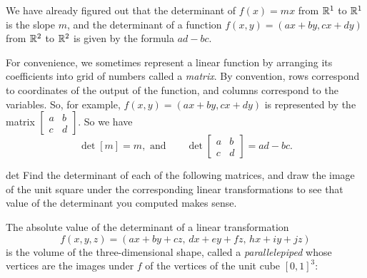 \documentclass[svgnames]{watsonbook}
\begin{document}
We have already figured out that the determinant of $f(x) = mx$ from
$\mathbb{R}^1$ to $\mathbb{R}^1$ is the slope $m$, and the determinant of a function
$f(x,y) = (ax + by, cx + dy)$ from $\mathbb{R}^2$ to $\mathbb{R}^2$ is given by the
formula $ad - bc$.

For convenience, we sometimes represent a linear function by arranging
its coefficients into grid of numbers called a \textit{matrix}. By
convention, rows correspond to coordinates of the output of the
function, and columns correspond to the variables. So, for example,
$f(x,y) = (ax + by, cx + dy)$ is represented by the matrix
$\left[\begin{array}{cc} a & b \\ c & d \end{array}\right]$. So we
have
\[
\det [m] = m, \text{ and} \qquad \det \left[\begin{array}{cc} a & b \\ c & d \end{array}\right] = ad - bc. 
\]

\begin{exercise}{}{det}
  Find the determinant of each of the following matrices, and draw the image of the unit square under the corresponding linear transformations to see that value of the determinant you computed makes sense. 

\pairofprobs{$\left[\begin{array}{cc} 1 & 0 \\ 0 & -1 \end{array}\right]$}{
$\left[\begin{array}{cc} 2 & 1 \\ 0 & 2 \end{array}\right]$}

\pairofprobs{$\left[\begin{array}{cc} 0 & 1 \\ -1 & 0 \end{array}\right]$}{
$\left[\begin{array}{cc} 2 & 1  \\ 4 & 2 \end{array}\right]$}
\end{exercise}

The absolute value of the determinant of a linear transformation 
\[
f(x,y,z) = (ax + by + cz, \, dx + ey + fz,\, hx + iy  + jz)
\]
is the volume of the three-dimensional shape, called a
\textit{parallelepiped} whose vertices are the images under $f$ of the
vertices of the unit cube $[0,1]^3$:
\end{document}
